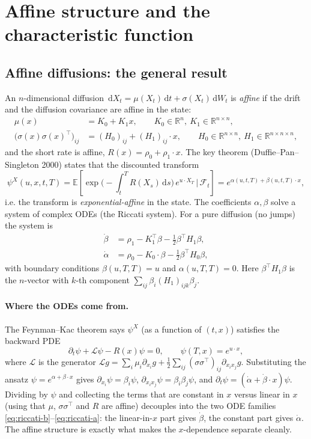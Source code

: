\documentclass[11pt]{article}
\newcommand{\R}{\mathbb{R}}
\newcommand{\E}{\mathbb{E}}
\newcommand{\dd}{\,\mathrm{d}}
\begin{document}
\section{Affine structure and the characteristic function}

\subsection{Affine diffusions: the general result}

An $n$-dimensional diffusion $\dd X_t = \mu(X_t)\dd t + \sigma(X_t)\dd W_t$ is
\emph{affine} if the drift and the diffusion covariance are affine in the state:
\begin{align}
\mu(x) &= K_0 + K_1 x, \qquad K_0\in\R^n,\ K_1\in\R^{n\times n},\\
\big(\sigma(x)\sigma(x)^\top\big)_{ij} &= (H_0)_{ij} + (H_1)_{ij}\cdot x,
\qquad H_0\in\R^{n\times n},\ H_1\in\R^{n\times n\times n},
\end{align}
and the short rate is affine, $R(x)=\rho_0+\rho_1\cdot x$. The key theorem (Duffie--Pan--Singleton 2000) states that the discounted transform
\begin{equation}
\psi^X(u,x,t,T) = \E\!\left[\exp\!\Big(-\!\int_t^T R(X_s)\dd s\Big)\,e^{u\cdot X_T}
\,\Big|\,\mathcal F_t\right]
= e^{\alpha(u,t,T)+\beta(u,t,T)\cdot x},
\label{eq:affineans}
\end{equation}
i.e. the transform is \emph{exponential-affine} in the state. The coefficients
$\alpha,\beta$ solve a system of complex ODEs (the Riccati system). For a pure diffusion
(no jumps) the system is
\begin{align}
\dot\beta &= \rho_1 - K_1^\top\beta - \tfrac12\beta^\top H_1\beta, \label{eq:riccati-b}\\
\dot\alpha &= \rho_0 - K_0\cdot\beta - \tfrac12\beta^\top H_0\beta, \label{eq:riccati-a}
\end{align}
with boundary conditions $\beta(u,T,T)=u$ and $\alpha(u,T,T)=0$. Here
$\beta^\top H_1\beta$ is the $n$-vector with $k$-th component
$\sum_{ij}\beta_i (H_1)_{ijk}\beta_j$.

\paragraph{Where the ODEs come from.}
The Feynman--Kac theorem says $\psi^X$ (as a function of $(t,x)$) satisfies the backward
PDE
\[
\partial_t \psi + \mathcal L\psi - R(x)\psi = 0,
\qquad \psi(T,x)=e^{u\cdot x},
\]
where $\mathcal L$ is the generator
$\mathcal L g = \sum_i \mu_i \partial_{x_i} g + \tfrac12\sum_{ij}(\sigma\sigma^\top)_{ij}\partial_{x_i x_j}g$.
Substituting the ansatz $\psi=e^{\alpha+\beta\cdot x}$ gives
$\partial_{x_i}\psi=\beta_i\psi$, $\partial_{x_ix_j}\psi=\beta_i\beta_j\psi$, and
$\partial_t\psi=(\dot\alpha+\dot\beta\cdot x)\psi$. Dividing by $\psi$ and collecting the
terms that are constant in $x$ versus linear in $x$ (using that $\mu$, $\sigma\sigma^\top$
and $R$ are affine) decouples into the two ODE families \eqref{eq:riccati-b}--\eqref{eq:riccati-a}: the linear-in-$x$ part gives $\dot\beta$, the constant part gives $\dot\alpha$. The
affine structure is exactly what makes the $x$-dependence separate cleanly.
\end{document}
